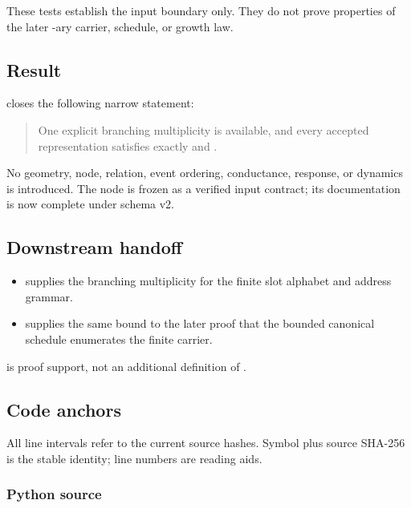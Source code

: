 These tests establish the input boundary only. They do not prove
properties of the later \texttt{\protect{}}-ary carrier, schedule, or growth law.

\subsection{Result}\label{result}

\texttt{\protect{}} closes the following narrow statement:

\begin{quote}
One explicit branching multiplicity \texttt{\protect{}} is available, and every
accepted representation satisfies exactly \texttt{\protect{}} and
\texttt{\protect{}}.
\end{quote}

No geometry, node, relation, event ordering, conductance, response, or
dynamics is introduced. The node is frozen as a verified input contract;
its documentation is now complete under schema v2.

\subsection{Downstream handoff}\label{downstream-handoff}

\begin{itemize}
\tightlist
\item
  \texttt{\protect{}} supplies the branching multiplicity for
  the finite slot alphabet and address grammar.
\item
  \texttt{\protect{}} supplies the same bound to the later
  proof that the bounded canonical schedule enumerates the finite
  carrier.
\end{itemize}

\texttt{\protect{}} is proof support, not an additional definition of
\texttt{\protect{}}.

\subsection{Code anchors}\label{code-anchors}

All line intervals refer to the current source hashes. Symbol plus
source SHA-256 is the stable identity; line numbers are reading aids.

\subsubsection{Python source}\label{python-source}

